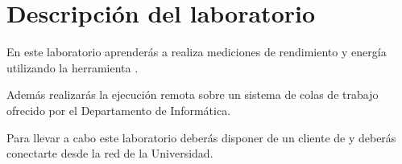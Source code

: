 \section{Descripción del laboratorio}

En este laboratorio aprenderás a realiza mediciones de rendimiento y energía
utilizando la herramienta .

Además realizarás la ejecución remota sobre un sistema de colas de trabajo 
ofrecido por el Departamento de Informática.

Para llevar a cabo este laboratorio deberás disponer de un cliente de 
y deberás conectarte desde la red de la Universidad.
